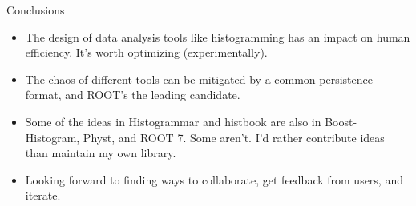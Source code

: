 \documentclass[aspectratio=169]{beamer}
\begin{document}
\begin{frame}{Conclusions}
\Large
\vspace{0.25 cm}
\begin{itemize}\setlength{\itemsep}{0.25 cm}
\item The design of data analysis tools like histogramming has an impact on human efficiency. It's worth optimizing (experimentally).
\item The chaos of different tools can be mitigated by a common persistence format, and ROOT's the leading candidate.
\item Some of the ideas in Histogrammar and histbook are also in Boost-Histogram, Physt, and ROOT 7. Some aren't. I'd rather contribute ideas than maintain my own library.
\item Looking forward to finding ways to collaborate, get feedback from users, and iterate.
\end{itemize}
\end{frame}
\end{document}
